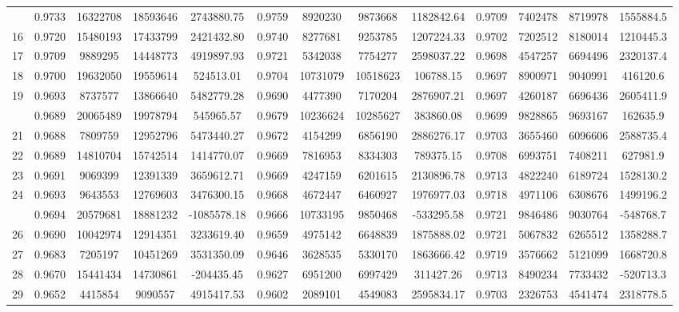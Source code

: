 \documentclass[
  12pt,
]{article}
\begin{document}
\begin{longtable}[t]{lcccccccccccc}
\addlinespace
15 & 0.9733 & 16322708 & 18593646 & 2743880.75 & 0.9759 & 8920230 & 9873668 & 1182842.64 & 0.9709 & 7402478 & 8719978 & 1555884.5\\
16 & 0.9720 & 15480193 & 17433799 & 2421432.80 & 0.9740 & 8277681 & 9253785 & 1207224.33 & 0.9702 & 7202512 & 8180014 & 1210445.3\\
17 & 0.9709 & 9889295 & 14448773 & 4919897.93 & 0.9721 & 5342038 & 7754277 & 2598037.22 & 0.9698 & 4547257 & 6694496 & 2320137.4\\
18 & 0.9700 & 19632050 & 19559614 & 524513.01 & 0.9704 & 10731079 & 10518623 & 106788.15 & 0.9697 & 8900971 & 9040991 & 416120.6\\
19 & 0.9693 & 8737577 & 13866640 & 5482779.28 & 0.9690 & 4477390 & 7170204 & 2876907.21 & 0.9697 & 4260187 & 6696436 & 2605411.9\\
\addlinespace
20 & 0.9689 & 20065489 & 19978794 & 545965.57 & 0.9679 & 10236624 & 10285627 & 383860.08 & 0.9699 & 9828865 & 9693167 & 162635.9\\
21 & 0.9688 & 7809759 & 12952796 & 5473440.27 & 0.9672 & 4154299 & 6856190 & 2886276.17 & 0.9703 & 3655460 & 6096606 & 2588735.4\\
22 & 0.9689 & 14810704 & 15742514 & 1414770.07 & 0.9669 & 7816953 & 8334303 & 789375.15 & 0.9708 & 6993751 & 7408211 & 627981.9\\
23 & 0.9691 & 9069399 & 12391339 & 3659612.71 & 0.9669 & 4247159 & 6201615 & 2130896.78 & 0.9713 & 4822240 & 6189724 & 1528130.2\\
24 & 0.9693 & 9643553 & 12769603 & 3476300.15 & 0.9668 & 4672447 & 6460927 & 1976977.03 & 0.9718 & 4971106 & 6308676 & 1499196.2\\
\addlinespace
25 & 0.9694 & 20579681 & 18881232 & -1085578.18 & 0.9666 & 10733195 & 9850468 & -533295.58 & 0.9721 & 9846486 & 9030764 & -548768.7\\
26 & 0.9690 & 10042974 & 12914351 & 3233619.40 & 0.9659 & 4975142 & 6648839 & 1875888.02 & 0.9721 & 5067832 & 6265512 & 1358288.7\\
27 & 0.9683 & 7205197 & 10451269 & 3531350.09 & 0.9646 & 3628535 & 5330170 & 1863666.42 & 0.9719 & 3576662 & 5121099 & 1668720.8\\
28 & 0.9670 & 15441434 & 14730861 & -204435.45 & 0.9627 & 6951200 & 6997429 & 311427.26 & 0.9713 & 8490234 & 7733432 & -520713.3\\
29 & 0.9652 & 4415854 & 9090557 & 4915417.53 & 0.9602 & 2089101 & 4549083 & 2595834.17 & 0.9703 & 2326753 & 4541474 & 2318778.5\\

\end{longtable}
\end{document}
